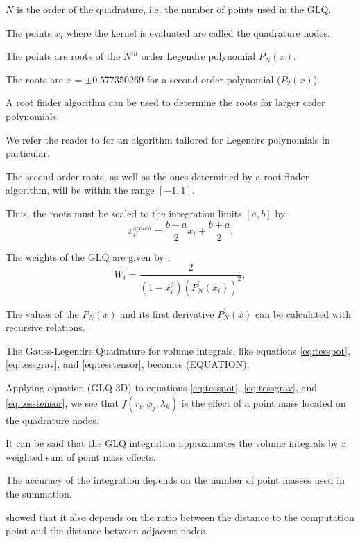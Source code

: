 \documentclass[manuscript]{geophysics}
\begin{document}
$N$ is the order of the quadrature, i.e. the number of points used in the GLQ.

The points $x_i$ where the kernel is evaluated are called the quadrature nodes.

The points are roots of the $N^{th}$ order Legendre polynomial $P_N(x)$.

The roots are $x = \pm 0.577350269$ for a second order polynomial ($P_2(x)$).

A root finder algorithm can be used to determine the roots for larger order
polynomials.

We refer the reader to \citet{Barrera-Figueroa2006} for an algorithm tailored
for Legendre polynomials in particular.

The second order roots, as well as the ones determined by a root finder
algorithm, will be within the range $[-1, 1]$.

Thus, the roots must be scaled to the integration limits $[a, b]$ by
\begin{equation}
    x^{scaled}_i = \frac{b - a}{2} x_i + \frac{b + a}{2}.
    \label{eq:glq_scaling}
\end{equation}

The weights of the GLQ are given by \citep{Hildebrand1987},
\begin{equation}
    W_i = \frac{2}{(1 - x_i^2)(P^\prime_N(x_i))^2},
    \label{eq:glq_weights}
\end{equation}

The values of the $P_N(x)$ and its first derivative $P^\prime_N(x)$ can be
calculated with recursive relations.

The Gauss-Legendre Quadrature for volume integrals, like equations
\ref{eq:tesspot}, \ref{eq:tessgrav}, and \ref{eq:tesstensor},
becomes \citep{Asgharzadeh2007} (EQUATION).

Applying equation (GLQ 3D) to equations
\ref{eq:tesspot}, \ref{eq:tessgrav}, and \ref{eq:tesstensor},
we see that $f(r_i, \phi_j, \lambda_k)$ is the effect of a point
mass located on the quadrature nodes.

It can be said that the GLQ integration approximates the volume integrals  by a
weighted sum of point mass effects.


The accuracy of the integration
depends on the number of point masses used in the summation.

\citet{Ku1977} showed that it also depends on the ratio between
the distance to the computation point and the distance between adjacent nodes.
\end{document}
